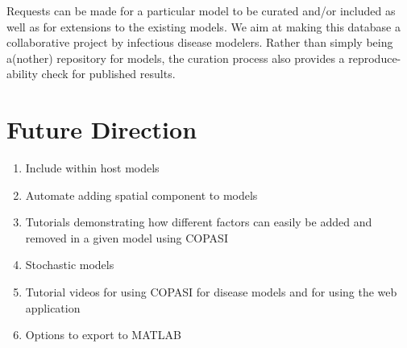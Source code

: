 \documentclass{article}
\begin{document}
Requests can be made for a particular model to be curated and/or included as well as for extensions to the existing models. We aim at making this database a collaborative project by infectious disease modelers. Rather than simply being a(nother) repository for models, the curation process also provides a reproduce-ability check for published results.

\section{Future Direction}
\begin{enumerate}
    \item Include within host models
    \item Automate adding spatial component to models
    \item Tutorials demonstrating how different factors can easily be added and removed in a given model using COPASI
    \item Stochastic models
    \item Tutorial videos for using COPASI for disease models and for using the web application
    \item Options to export to MATLAB
    
\end{enumerate}
\end{document}
